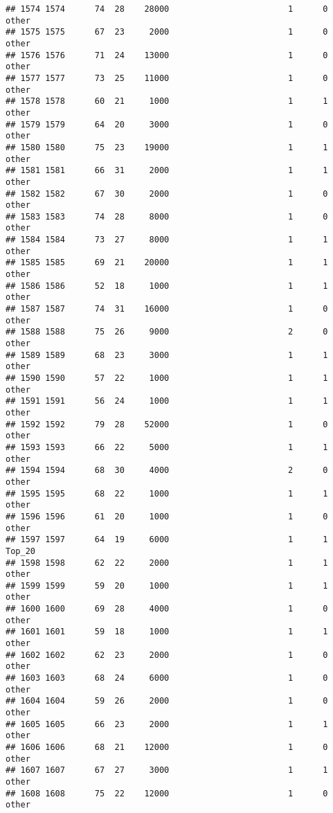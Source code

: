 \documentclass[
]{article}
\begin{document}
\begin{verbatim}
## 1574 1574      74  28    28000                        1      0    other
## 1575 1575      67  23     2000                        1      0    other
## 1576 1576      71  24    13000                        1      0    other
## 1577 1577      73  25    11000                        1      0    other
## 1578 1578      60  21     1000                        1      1    other
## 1579 1579      64  20     3000                        1      0    other
## 1580 1580      75  23    19000                        1      1    other
## 1581 1581      66  31     2000                        1      1    other
## 1582 1582      67  30     2000                        1      0    other
## 1583 1583      74  28     8000                        1      0    other
## 1584 1584      73  27     8000                        1      1    other
## 1585 1585      69  21    20000                        1      1    other
## 1586 1586      52  18     1000                        1      1    other
## 1587 1587      74  31    16000                        1      0    other
## 1588 1588      75  26     9000                        2      0    other
## 1589 1589      68  23     3000                        1      1    other
## 1590 1590      57  22     1000                        1      1    other
## 1591 1591      56  24     1000                        1      1    other
## 1592 1592      79  28    52000                        1      0    other
## 1593 1593      66  22     5000                        1      1    other
## 1594 1594      68  30     4000                        2      0    other
## 1595 1595      68  22     1000                        1      1    other
## 1596 1596      61  20     1000                        1      0    other
## 1597 1597      64  19     6000                        1      1   Top_20
## 1598 1598      62  22     2000                        1      1    other
## 1599 1599      59  20     1000                        1      1    other
## 1600 1600      69  28     4000                        1      0    other
## 1601 1601      59  18     1000                        1      1    other
## 1602 1602      62  23     2000                        1      0    other
## 1603 1603      68  24     6000                        1      0    other
## 1604 1604      59  26     2000                        1      0    other
## 1605 1605      66  23     2000                        1      1    other
## 1606 1606      68  21    12000                        1      0    other
## 1607 1607      67  27     3000                        1      1    other
## 1608 1608      75  22    12000                        1      0    other

\end{verbatim}
\end{document}
